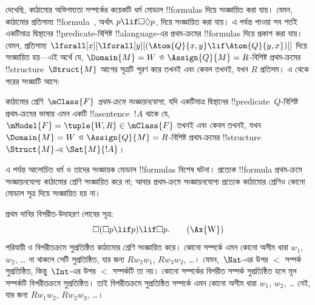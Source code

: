 \documentclass[../../../include/open-logic-section]{subfiles}
\begin{document}


দেখেছি, কাঠামোর অভিগম্যতা সম্পর্কের কয়েকটি ধর্ম মোডাল !!{formula}s দিয়ে সংজ্ঞায়িত করা যায়। যেমন, কাঠামোর প্রতিসাম্য !!{formula}~, অর্থাৎ $p \lif \Box\Diamond
p$, দিয়ে সংজ্ঞায়িত করা যায়। এ পর্যন্ত পাওয়া সব শর্তই একটিমাত্র দ্বিস্থানের !!{predicate}-বিশিষ্ট !!a{language}-এর প্রথম-ক্রমের !!{formula}s দিয়ে প্রকাশ করা যায়। যেমন, প্রতিসাম্য $\lforall[x][\lforall[y][(\Atom{Q}{x,y} \lif \Atom{Q}{y, x})]]$ দিয়ে সংজ্ঞায়িত হয়—এই অর্থে যে, $\Domain{M} =
W$ ও $\Assign{Q}{M} = R$-বিশিষ্ট প্রথম-ক্রমের !!{structure}~$\Struct{M}$ আগের সূত্রটি পূরণ করে তখনই এবং কেবল তখনই, যখন $R$ প্রতিসম। এ থেকে পরের সংজ্ঞাটি আসে:

\begin{defn}
  কাঠামোর শ্রেণি~$\mClass{F}$ \emph{প্রথম-ক্রমে সংজ্ঞায়নযোগ্য}, যদি একটিমাত্র দ্বিস্থানের !!{predicate}~$Q$-বিশিষ্ট প্রথম-ক্রমের ভাষায় এমন একটি !!a{sentence}~$!A$ থাকে যে, $\mModel{F} =
  \tuple{W, R} \in \mClass{F}$ তখনই এবং কেবল তখনই, যখন $\Domain{M} = W$ ও $\Assign{Q}{M}
  = R$-বিশিষ্ট প্রথম-ক্রমের !!{structure}~$\Struct{M}$-এ $\Sat{M}{!A}$।
\end{defn}

এ পর্যন্ত আলোচিত ধর্ম ও তাদের সংজ্ঞায়ক মোডাল !!{formula}s বিশেষ ঘটনা। প্রত্যেক !!{formula} প্রথম-ক্রমে সংজ্ঞায়নযোগ্য কাঠামোর শ্রেণি সংজ্ঞায়িত করে না; আবার প্রথম-ক্রমে সংজ্ঞায়নযোগ্য প্রত্যেক কাঠামোর শ্রেণিও কোনো মোডাল সূত্র দিয়ে সংজ্ঞায়িত হয় না।

প্রথম দাবির বিপরীত-উদাহরণ লোবের সূত্র:
\begin{equation}
\Box(\Box p \lif p) \lif \Box p. \tag{\Ax{W}}
\end{equation}
 পরিযায়ী ও বিপরীতক্রমে সুপ্রতিষ্ঠিত কাঠামোর শ্রেণি সংজ্ঞায়িত করে। কোনো সম্পর্কে এমন কোনো অসীম ধারা $w_1$, $w_2$, \dots{} না থাকলে সেটি সুপ্রতিষ্ঠিত, যার জন্য $Rw_2w_1$, $Rw_3w_2$, \dots। যেমন,~$\Nat$-এর উপর $<$ সম্পর্ক সুপ্রতিষ্ঠিত, কিন্তু~$\Int$-এর উপর $<$ সম্পর্কটি তা নয়। কোনো সম্পর্কের বিপরীত সম্পর্ক সুপ্রতিষ্ঠিত হলে মূল সম্পর্কটি বিপরীতক্রমে সুপ্রতিষ্ঠিত। তাই বিপরীতক্রমে সুপ্রতিষ্ঠিত সম্পর্কে এমন কোনো অসীম ধারা $w_1$, $w_2$, \dots{} নেই, যার জন্য $Rw_1w_2$, $Rw_2w_3$, \dots।
\end{document}
